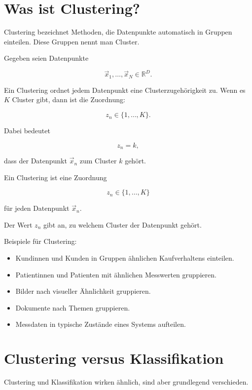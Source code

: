 \section{Was ist Clustering?}

Clustering bezeichnet Methoden, die Datenpunkte automatisch in Gruppen einteilen.
Diese Gruppen nennt man Cluster.

Gegeben seien Datenpunkte

\[
    \vec{x}_1,\dots,\vec{x}_N
    \in
    \mathbb{R}^D.
\]

Ein Clustering ordnet jedem Datenpunkt eine Clusterzugehörigkeit zu.
Wenn es \(K\) Cluster gibt, dann ist die Zuordnung:

\[
    z_n \in \{1,\dots,K\}.
\]

Dabei bedeutet

\[
    z_n=k,
\]

dass der Datenpunkt \(\vec{x}_n\) zum Cluster \(k\) gehört.

\begin{definitionbox}
Ein Clustering ist eine Zuordnung

\[
    z_n \in \{1,\dots,K\}
\]

für jeden Datenpunkt \(\vec{x}_n\).

Der Wert \(z_n\) gibt an, zu welchem Cluster der Datenpunkt gehört.
\end{definitionbox}

\begin{examplebox}
Beispiele für Clustering:

\begin{itemize}
    \item Kundinnen und Kunden in Gruppen ähnlichen Kaufverhaltens einteilen.
    \item Patientinnen und Patienten mit ähnlichen Messwerten gruppieren.
    \item Bilder nach visueller Ähnlichkeit gruppieren.
    \item Dokumente nach Themen gruppieren.
    \item Messdaten in typische Zustände eines Systems aufteilen.
\end{itemize}
\end{examplebox}

\section{Clustering versus Klassifikation}

Clustering und Klassifikation wirken ähnlich, sind aber grundlegend verschieden.

